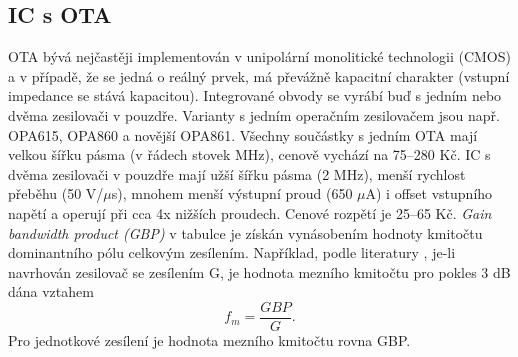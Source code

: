 \subsection{IC s OTA}
OTA bývá nejčastěji implementován v unipolární monolitické technologii (CMOS) a v případě, že se jedná o reálný prvek, má převážně kapacitní charakter (vstupní impedance se stává kapacitou). Integrované obvody se vyrábí buď s jedním nebo dvěma zesilovači v pouzdře. Varianty s jedním operačním zesilovačem jsou např. OPA615, OPA860 a novější OPA861. Všechny součástky s jedním OTA mají velkou šířku pásma (v řádech stovek MHz), cenově vychází na 75--280 Kč. IC s dvěma zesilovači v pouzdře mají užší šířku pásma (2 MHz), menší rychlost přeběhu (50 V/$\mu$s), mnohem menší výstupní proud (650 $\mu$A) i offset vstupního napětí a operují při cca 4x nižších proudech. Cenové rozpětí je 25--65 Kč. \textit{Gain bandwidth product (GBP)} v tabulce je získán vynásobením hodnoty kmitočtu dominantního pólu celkovým zesílením. Například, podle literatury \cite{11}, je-li navrhován zesilovač se zesílením G, je hodnota mezního kmitočtu pro pokles 3 dB dána vztahem
\begin{equation}
f_m = \frac{GBP}{G}.
\end{equation}
\noindent Pro jednotkové zesílení je hodnota mezního kmitočtu rovna GBP.
\renewcommand{\arraystretch}{1.5}
\begin{table}[h]
  \caption[Porovnání integrovaných obvodů s jedním OTA]{\label{tab:Porovnání IC s jedním OTA}Porovnání IC s jedním OTA \cite{16}}
  \end{table}
